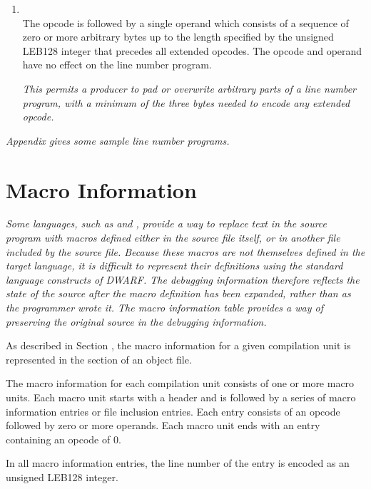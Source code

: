 \begin{enumerate}[1. ]
\bb
\item \textbf{\DWLNEpaddingTARG} \\
The \DWLNEpaddingNAME{} opcode is followed by a single
operand which consists of a sequence of zero or more 
arbitrary bytes up to the length specified by the unsigned 
LEB128 integer that precedes all 
extended opcodes.  The opcode and operand have no
effect on the line number program.

\textit{This permits a producer to pad or overwrite arbitrary
parts of a line number program, with a minimum of the
three bytes needed to encode any extended opcode.}
\eb

\end{enumerate}
\db
\textit{Appendix  
gives some sample line number programs.}

\section{Macro Information}
\label{chap:macroinformation}
\textit{Some languages, such as \C{} and \Cplusplus{}, 
provide a way to replace
text in the source program with macros defined either in the
source file itself, or in another file included by the source
file.  Because these macros are not themselves defined in the
target language, it is difficult to represent their definitions
using the standard language constructs of DWARF. The debugging
information therefore reflects the state of the source after
the macro definition has been expanded, rather than as the
programmer wrote it. The macro information table provides a way
of preserving the original source in the debugging information.}

As described in 
Section ,
the macro information for a
given compilation unit is represented in the 
\dotdebugmacro{}
section of an object file. 
\db

The macro information for each compilation unit consists of one or
more macro units.  Each macro unit starts with a header
and is followed by a series of macro information entries or file
inclusion entries.  Each entry consists of an opcode followed by
zero or more operands. Each macro unit ends with an entry
containing an opcode of 0.

In all macro information entries,
the line number of the entry is encoded as an
unsigned LEB128 integer.

